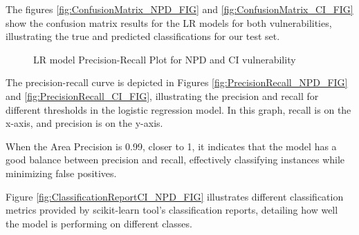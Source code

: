 \documentclass[journal,a4paper]{IEEEtran}
\begin{document}
The figures \ref{fig:ConfusionMatrix_NPD_FIG} and \ref{fig:ConfusionMatrix_CI_FIG} show the confusion matrix results for the LR models for both vulnerabilities, illustrating the true and predicted classifications for our test set.

\begin{figure}
\centering     %
{}
\caption{LR model Precision-Recall Plot for NPD and CI vulnerability}
\end{figure}


The precision-recall curve is depicted in Figures \ref{fig:PrecisionRecall_NPD_FIG} and \ref{fig:PrecisionRecall_CI_FIG}, illustrating the precision and recall for different thresholds in the logistic regression model. In this graph, recall is on the x-axis, and precision is on the y-axis.

When the Area Precision is 0.99, closer to 1, it indicates that the model has a good balance between precision and recall, effectively classifying instances while minimizing false positives.

Figure \ref{fig:ClassificationReportCI_NPD_FIG} illustrates different classification metrics provided by scikit-learn tool's classification reports, detailing how well the model is performing on different classes.
\end{document}
